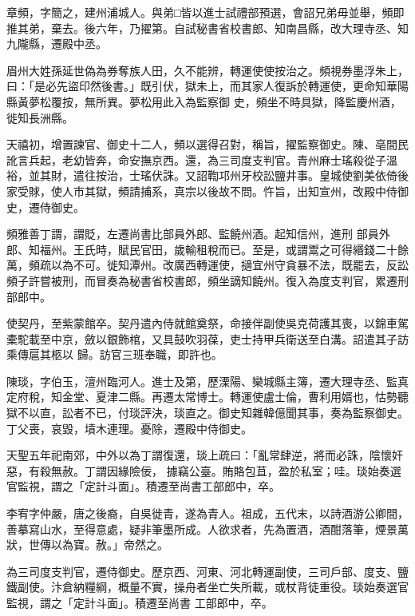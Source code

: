 \begin{pinyinscope}
 章頻，字簡之，建州浦城人。與弟□皆以進士試禮部預選，會詔兄弟毋並舉，頻即推其弟，棄去。後六年，乃擢第。自試秘書省校書郎、知南昌縣，改大理寺丞、知九隴縣，遷殿中丞。



 眉州大姓孫延世偽為券奪族人田，久不能辨，轉運使使按治之。頻視券墨浮朱上，曰：「是必先盜印然後書。」既引伏，獄未上，而其家人復訴於轉運使，更命知華陽縣黃夢松覆按，無所異。夢松用此入為監察御
 史，頻坐不時具獄，降監慶州酒，徙知長洲縣。



 天禧初，增置諫官、御史十二人，頻以選得召對，稱旨，擢監察御史。陳、亳間民訛言兵起，老幼皆奔，命安撫京西。還，為三司度支判官。青州麻士瑤殺從子溫裕，並其財，遣往按治，士瑤伏誅。又詔鞫邛州牙校訟鹽井事。皇城使劉美依倚後家受賕，使人市其獄，頻請捕系，真宗以後故不問。忤旨，出知宣州，改殿中侍御史，遷侍御史。



 頻雅善丁謂，謂貶，左遷尚書比部員外郎、監饒州酒。起知信州，進刑
 部員外郎、知福州。王氏時，賦民官田，歲輸租稅而已。至是，或謂鬻之可得緡錢二十餘萬，頻疏以為不可。徙知潭州。改廣西轉運使，擿宜州守貪暴不法，既罷去，反訟頻子許嘗被刑，而冒奏為秘書省校書郎，頻坐謫知饒州。復入為度支判官，累遷刑部郎中。



 使契丹，至紫蒙館卒。契丹遣內侍就館奠祭，命接伴副使吳克荷護其喪，以錦車駕橐駝載至中京，斂以銀飾棺，又具鼓吹羽葆，吏士持甲兵衛送至白溝。詔遣其子訪乘傳扈其柩以
 歸。訪官三班奉職，即許也。



 陳琰，字伯玉，澶州臨河人。進士及第，歷溧陽、欒城縣主簿，遷大理寺丞、監真定府稅，知金堂、夏津二縣。再遷太常博士。轉運使盧士倫，曹利用婿也，怙勢聽獄不以直，訟者不已，付琰評決，琰直之。御史知雜韓億聞其事，奏為監察御史。丁父喪，哀毀，墳木連理。憂除，遷殿中侍御史。



 天聖五年祀南郊，中外以為丁謂復還，琰上疏曰：「亂常肆逆，將而必誅，陰懷奸惡，有殺無赦。丁謂因緣險佞，
 據竊公臺。賄賂包苴，盈於私室；哇。琰始奏選官監視，謂之「定計斗面」。積遷至尚書工部郎中，卒。



 李宥字仲嚴，唐之後裔，自吳徙青，遂為青人。祖成，五代末，以詩酒游公卿間，善摹寫山水，至得意處，疑非筆墨所成。人欲求者，先為置酒，酒酣落筆，煙景萬狀，世傳以為寶。赦。」帝然之。



 為三司度支判官，遷侍御史。歷京西、河東、河北轉運副使，三司戶部、度支、鹽鐵副使。汴倉納糧綱，概量不實，操舟者坐亡失所載，或杖背徒重役。琰始奏選官監視，謂之「定計斗面」。積遷至尚書
 工部郎中，卒。




\end{pinyinscope}
